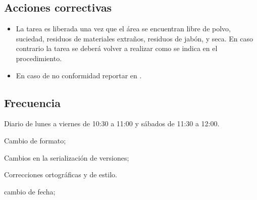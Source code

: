 \subsection{Acciones correctivas}

\begin{itemize}
	\item La tarea es liberada una vez que el área se encuentran libre de polvo, suciedad, residuos de materiales extraños, residuos de jabón, y seca. En caso contrario la tarea se deberá volver a realizar como se indica en el procedimiento.
	\item En caso de no conformidad reportar en \RAC.
\end{itemize}

\subsection{Frecuencia}

Diario de lunes a viernes de 10:30 a 11:00 y sábados de 11:30 a 12:00.

\begin{changelog}[simple, sectioncmd=\subsection*,label=changelog-3.14]
	\begin{version}[v=2.0, date=2023--01, author=Pablo E. Alanis]
		\item Cambio de formato;
		\item Cambios en la serialización de versiones;
		\item Correcciones ortográficas y de estilo.
	\end{version}

	\begin{version}[v=1.7, date=2022--05, author=Alonso M.]
		\item cambio de fecha;
	\end{version}	

\end{changelog}